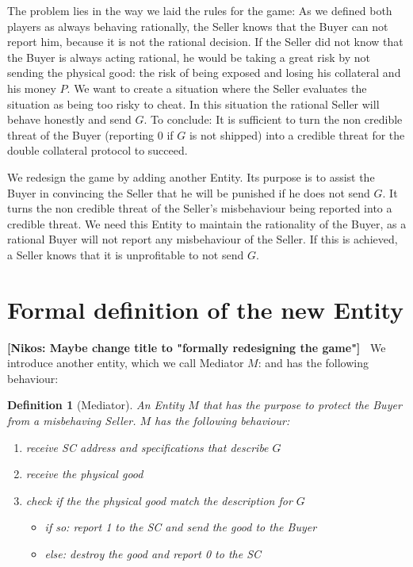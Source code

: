 \documentclass{cacthesis}
\newcommand{\authnote}[3]{{ \footnotesize \textbf{#1[#2: #3]~}}}
\newcommand{\niknote}[1]{\authnote{\color{red}}{Nikos}{#1}}
\newtheorem{definition}{Definition}
\begin{document}
The problem lies in the way we laid the rules for the game: As we defined both players as always behaving rationally, the Seller knows that the Buyer can not report him, because it is not the rational decision.
If the Seller did not know that the Buyer is always acting rational, he would be taking a great risk by not sending the physical good: the risk of being exposed and losing his collateral and his money $P$.
We want to create a situation where the Seller evaluates the situation as being too risky to cheat. In this situation the rational Seller will behave honestly and  send $G$.
To conclude: It is sufficient to turn the non credible threat of the Buyer (reporting 0 if $G$ is not shipped) into a credible threat for the double collateral protocol to succeed.\newline

We redesign the game by adding another Entity. Its purpose is to assist the Buyer in convincing the Seller that he will be punished if he does not send $G$. It turns the non credible threat of the Seller's misbehaviour being reported into a credible threat. We need this Entity to maintain the rationality of the Buyer, as a rational Buyer will not report any misbehaviour of the Seller.
If this is achieved, a Seller knows that it is unprofitable to not send $G$.\newline


\section{Formal definition of the new Entity}
\label{sec:formal-definition-mediator}
\niknote{Maybe change title to "formally redesigning the game"}
We introduce another entity, which we call Mediator $M$: and has the following behaviour:
\begin{definition}[Mediator]
\label{def:mediator}
An Entity $M$ that has the purpose to protect the Buyer from a misbehaving Seller. $M$ has the following behaviour:
\begin{enumerate}
    \item receive SC address and specifications that describe $G$
    \item receive the physical good
    \item check if the the physical good match the description for $G$
    \begin{itemize}
        \item if so: report 1 to the SC and send the good to the Buyer
        \item else: destroy the good and report 0 to the SC\newline
    \end{itemize}
\end{enumerate}
\end{definition}
\end{document}
